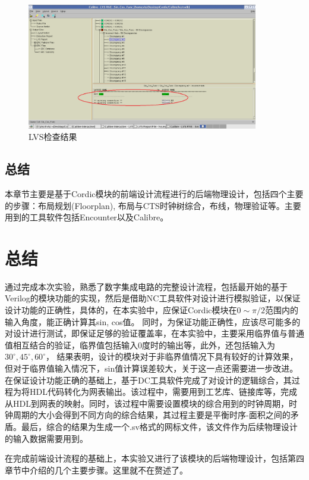 \documentclass[a4paper,12pt]{report}
\begin{document}
\begin{figure}[!hbtp]
\centering
\includegraphics[width=0.9\textwidth]{LVS1}
\caption{LVS检查结果}
\label{figure4.10}
\end{figure}

\section{总结}
本章节主要是基于Cordic模块的前端设计流程进行的后端物理设计，包括四个主要的步骤：布局规划(Floorplan), 布局与CTS时钟树综合，布线，物理验证等。主要用到的工具软件包括Encounter以及Calibre。


\chapter{总结}
通过完成本次实验，熟悉了数字集成电路的完整设计流程，包括最开始的基于Verilog的模块功能的实现，然后是借助NC工具软件对设计进行模拟验证，以保证设计功能的正确性，具体的，在本实验中，应保证Cordic模块在$0 \sim \pi/2$范围内的输入角度，能正确计算其sin, cos值。
同时，为保证功能正确性，应该尽可能多的对设计进行测试，即保证足够的验证覆盖率，在本实验中，主要采用临界值与普通值相互结合的验证，临界值包括输入0度时的输出等，此外，还包括输入为$30^{\circ}, 45^{\circ}, 60^{\circ}$， 结果表明，设计的模块对于非临界值情况下具有较好的计算效果，但对于临界值输入情况下，sin值计算误差较大，关于这一点还需要进一步改进。
在保证设计功能正确的基础上，基于DC工具软件完成了对设计的逻辑综合，其过程为将HDL代码转化为网表输出。该过程中，需要用到工艺库、链接库等，完成从HDL到网表的映射。同时，该过程中需要设置模块的综合用到的时钟周期，时钟周期的大小会得到不同方向的综合结果，其过程主要是平衡时序-面积之间的矛盾。最后，综合的结果为生成一个.sv格式的网标文件，该文件作为后续物理设计的输入数据需要用到。

在完成前端设计流程的基础上，本实验又进行了该模块的后端物理设计，包括第四章节中介绍的几个主要步骤。这里就不在赘述了。
\end{document}
